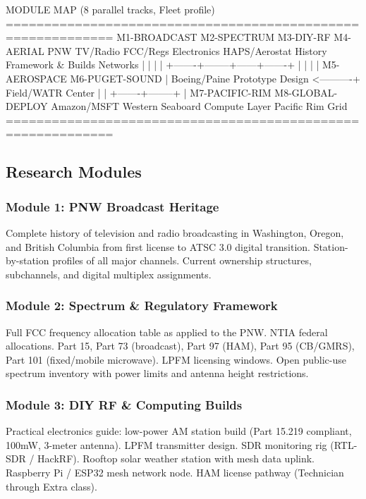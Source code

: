 \documentclass[11pt,letterpaper]{article}
\begin{document}
\begin{asciibox}
MODULE MAP (8 parallel tracks, Fleet profile)
============================================================
  M1-BROADCAST    M2-SPECTRUM    M3-DIY-RF      M4-AERIAL
  PNW TV/Radio    FCC/Regs       Electronics    HAPS/Aerostat
  History         Framework      & Builds       Networks
       |               |              |              |
       +-------+--------+------+-------+             |
               |               |                     |
          M5-AEROSPACE    M6-PUGET-SOUND              |
          Boeing/Paine    Prototype Design  <----------+
          Field/WATR      Center
               |               |
               +-------+--------+
                       |
               M7-PACIFIC-RIM    M8-GLOBAL-DEPLOY
               Amazon/MSFT       Western Seaboard
               Compute Layer     Pacific Rim Grid
============================================================
\end{asciibox}

\subsection{Research Modules}

\subsubsection{Module 1: PNW Broadcast Heritage}
Complete history of television and radio broadcasting in Washington, Oregon, and British Columbia from first license to ATSC 3.0 digital transition. Station-by-station profiles of all major channels. Current ownership structures, subchannels, and digital multiplex assignments.

\subsubsection{Module 2: Spectrum \& Regulatory Framework}
Full FCC frequency allocation table as applied to the PNW. NTIA federal allocations. Part 15, Part 73 (broadcast), Part 97 (HAM), Part 95 (CB/GMRS), Part 101 (fixed/mobile microwave). LPFM licensing windows. Open public-use spectrum inventory with power limits and antenna height restrictions.

\subsubsection{Module 3: DIY RF \& Computing Builds}
Practical electronics guide: low-power AM station build (Part 15.219 compliant, 100mW, 3-meter antenna). LPFM transmitter design. SDR monitoring rig (RTL-SDR / HackRF). Rooftop solar weather station with mesh data uplink. Raspberry Pi / ESP32 mesh network node. HAM license pathway (Technician through Extra class).
\end{document}

